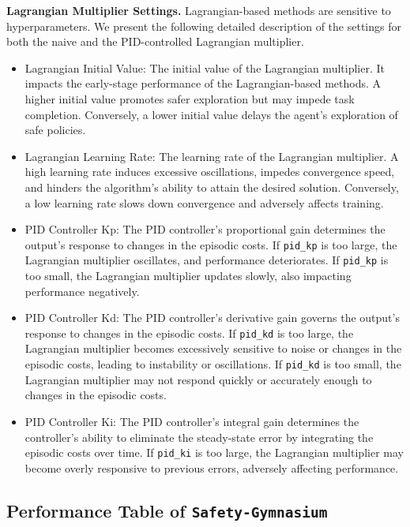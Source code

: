 \documentclass{article}
\begin{document}
\textbf{Lagrangian Multiplier Settings.}\label{lag_analysis}
Lagrangian-based methods are sensitive to hyperparameters. We present the following detailed description of the settings for both the naive and the PID-controlled Lagrangian multiplier.
\begin{itemize}
\item Lagrangian Initial Value: The initial value of the Lagrangian multiplier. It impacts the early-stage performance of the Lagrangian-based methods. A higher initial value promotes safer exploration but may impede task completion. Conversely, a lower initial value delays the agent's exploration of safe policies.
\item Lagrangian Learning Rate: The learning rate of the Lagrangian multiplier. A high learning rate induces excessive oscillations, impedes convergence speed, and hinders the algorithm's ability to attain the desired solution. Conversely, a low learning rate slows down convergence and adversely affects training.
\item PID Controller Kp: The PID controller's proportional gain determines the output's response to changes in the episodic costs. If \texttt{pid\_kp} is too large, the Lagrangian multiplier oscillates, and performance deteriorates. If \texttt{pid\_kp} is too small, the Lagrangian multiplier updates slowly, also impacting performance negatively.
\item PID Controller Kd: The PID controller's derivative gain governs the output's response to changes in the episodic costs. If \texttt{pid\_kd} is too large, the Lagrangian multiplier becomes excessively sensitive to noise or changes in the episodic costs, leading to instability or oscillations. If \texttt{pid\_kd} is too small, the Lagrangian multiplier may not respond quickly or accurately enough to changes in the episodic costs.
\item PID Controller Ki: The PID controller's integral gain determines the controller's ability to eliminate the steady-state error by integrating the episodic costs over time. If \texttt{pid\_ki} is too large, the Lagrangian multiplier may become overly responsive to previous errors, adversely affecting performance.
\end{itemize}

\clearpage

\subsection{Performance Table of \texttt{Safety-Gymnasium}}
\end{document}
